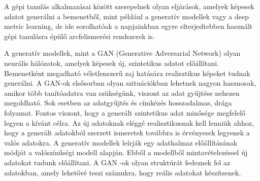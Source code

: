 
A gépi tanulás alkalmazásai között szerepelnek olyan eljárások, amelyek képesek adatot generálni a bemenetből, mint például a generatív modellek vagy a deep metric learning, de ide sorolhatóak a napjainkban egyre elterjedtebben használt gépi tanulásra épülő arcfelismerési rendszerek is.

A generatív modellek, mint a GAN (Generative Adversarial Network) olyan neurális hálózatok, amelyek képesek új, szintetikus adatot előállítani. Bemenetként megadható véletlenszerű zaj hatására realisztikus képeket tudnak generálni. A GAN-ok elsősorban olyan szituációkban lehetnek nagyon hasznosak, amikor több tanítóadatra van szükségünk, viszont az adat gyűjtése nehezen megoldható. Sok esetben az adatgyűjtés és címkézés hosszadalmas, drága folyamat. Fontos viszont, hogy a generált szintetikus adat minősége megfelelő legyen a kívánt célra. Az új adatoknak eléggé realisztikusnak kell lenniük ahhoz, hogy a generált adatokból szerzett ismeretek továbbra is érvényesek legyenek a valós adatokra. A generatív modellek leírják egy adathalmaz előállításának módját a valószínűségi modell alapján. Ebből a modellből mintavételezéssel új adatokat tudunk előállítani. A GAN -ok olyan struktúrát fedeznek fel az adatokban, amely lehetővé teszi számukra, hogy reális adatokat készítsenek.




